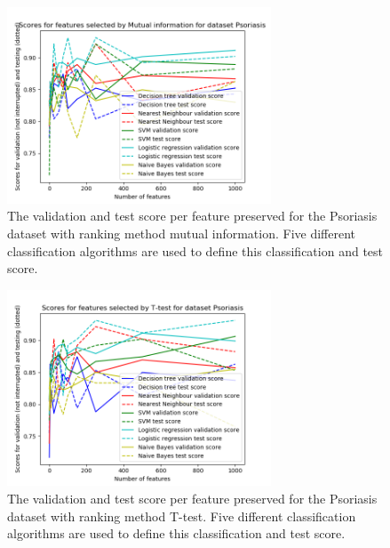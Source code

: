 \documentclass[10pt,a4paper]{article}
\begin{document}
	\begin{figure}[H]
		\includegraphics[width=0.7\textwidth]{Psoriasis_MI_Val_Test_Score.png}
		\caption{The validation and test score per feature preserved for the Psoriasis dataset with ranking method mutual information. Five different classification algorithms are used to define this classification and test score.}
		\label{fig:Psoriasis_MI_Val_Test_Score}
	\end{figure}
	
	\begin{figure}[H]
		\includegraphics[width=0.7\textwidth]{Psoriasis_T_Val_Test_Score.png}
		\caption{The validation and test score per feature preserved for the Psoriasis dataset with ranking method T-test. Five different classification algorithms are used to define this classification and test score.}
		\label{fig:Psoriasis_T_Val_Test_Score}
	\end{figure}
	
	
\end{document}
